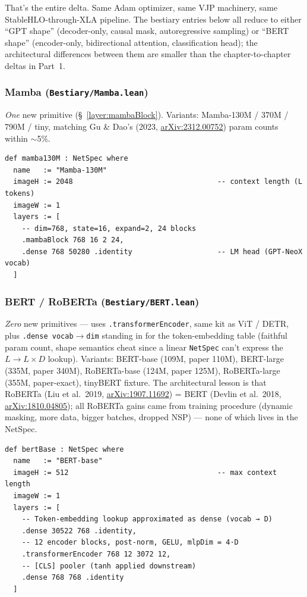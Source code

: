 That's the entire delta. Same Adam optimizer, same VJP machinery, same
StableHLO-through-XLA pipeline. The bestiary entries below all reduce to
either ``GPT shape'' (decoder-only, causal mask, autoregressive
sampling) or ``BERT shape'' (encoder-only, bidirectional attention,
classification head); the architectural differences between them are
smaller than the chapter-to-chapter deltas in Part~1.

\subsubsection*{Mamba (\texttt{Bestiary/Mamba.lean})}
\emph{One} new primitive (\S~\ref{layer:mambaBlock}). Variants: Mamba-130M / 370M / 790M /
tiny, matching Gu \& Dao's (2023,
\href{https://arxiv.org/abs/2312.00752}{arXiv:2312.00752}) param counts
within $\sim$5\%.

\begin{verbatim}
def mamba130M : NetSpec where
  name   := "Mamba-130M"
  imageH := 2048                                  -- context length (L tokens)
  imageW := 1
  layers := [
    -- dim=768, state=16, expand=2, 24 blocks
    .mambaBlock 768 16 2 24,
    .dense 768 50280 .identity                    -- LM head (GPT-NeoX vocab)
  ]
\end{verbatim}

\subsubsection*{BERT / RoBERTa (\texttt{Bestiary/BERT.lean})}
\emph{Zero} new primitives --- uses \texttt{.transformerEncoder}, same kit as
ViT / DETR, plus \texttt{.dense vocab$\to$dim} standing in for the
token-embedding table (faithful param count, shape semantics cheat
since a linear \texttt{NetSpec} can't express the $L \to L \times D$
lookup). Variants: BERT-base (109M, paper 110M), BERT-large (335M,
paper 340M), RoBERTa-base (124M, paper 125M), RoBERTa-large (355M,
paper-exact), tinyBERT fixture. The architectural lesson is that
RoBERTa (Liu et al.\ 2019,
\href{https://arxiv.org/abs/1907.11692}{arXiv:1907.11692}) = BERT
(Devlin et al.\ 2018,
\href{https://arxiv.org/abs/1810.04805}{arXiv:1810.04805}); all
RoBERTa gains came from training procedure
(dynamic masking, more data, bigger batches, dropped NSP) --- none
of which lives in the NetSpec.

\begin{verbatim}
def bertBase : NetSpec where
  name   := "BERT-base"
  imageH := 512                                   -- max context length
  imageW := 1
  layers := [
    -- Token-embedding lookup approximated as dense (vocab → D)
    .dense 30522 768 .identity,
    -- 12 encoder blocks, post-norm, GELU, mlpDim = 4·D
    .transformerEncoder 768 12 3072 12,
    -- [CLS] pooler (tanh applied downstream)
    .dense 768 768 .identity
  ]
\end{verbatim}

